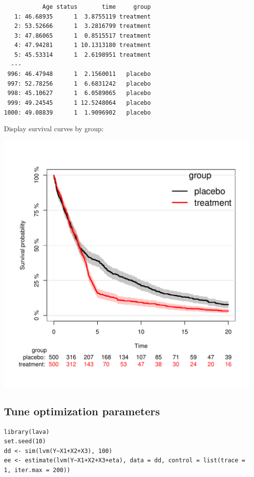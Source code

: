 \documentclass{article}
\begin{document}
\begin{verbatim}
           Age status       time     group
   1: 46.68935      1  3.8755119 treatment
   2: 53.52666      1  3.2816799 treatment
   3: 47.86065      1  0.8515517 treatment
   4: 47.94281      1 10.1313180 treatment
   5: 45.53314      1  2.6198951 treatment
  ---                                     
 996: 46.47948      1  2.1560011   placebo
 997: 52.78256      1  6.6831242   placebo
 998: 45.10627      1  6.0589065   placebo
 999: 49.24545      1 12.5248064   placebo
1000: 49.08839      1  1.9096902   placebo
\end{verbatim}

Display survival curves by group:
\begin{center}
\includegraphics[width=.9\linewidth]{./figures/fig-delayedTreatmentEffect.pdf}
\end{center}

\subsection{Tune optimization parameters}
\label{sec:org6771fe2}

\lstset{language=r,label= ,caption= ,captionpos=b,numbers=none}
\begin{lstlisting}
library(lava)
set.seed(10)
dd <- sim(lvm(Y~X1+X2+X3), 100)
ee <- estimate(lvm(Y~X1+X2+X3+eta), data = dd, control = list(trace = 1, iter.max = 200))
\end{lstlisting}
\end{document}

